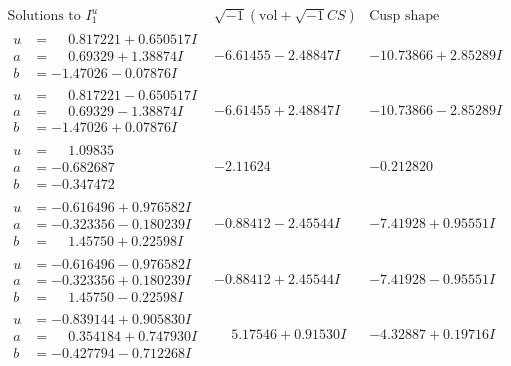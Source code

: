\documentclass[1p]{elsarticle_modified}
\theoremstyle{definition}
\newcommand{\I}{\sqrt{-1}}
\begin{document}
$$\begin{array}{c|c|c}  
\text{Solutions to }I^u_{1}& \I (\text{vol} + \sqrt{-1}CS) & \text{Cusp shape}\\
 \hline 
\begin{aligned}
u &= \phantom{-}0.817221 + 0.650517 I \\
a &= \phantom{-}0.69329 + 1.38874 I \\
b &= -1.47026 - 0.07876 I\end{aligned}
 & -6.61455 - 2.48847 I & -10.73866 + 2.85289 I \\ \hline\begin{aligned}
u &= \phantom{-}0.817221 - 0.650517 I \\
a &= \phantom{-}0.69329 - 1.38874 I \\
b &= -1.47026 + 0.07876 I\end{aligned}
 & -6.61455 + 2.48847 I & -10.73866 - 2.85289 I \\ \hline\begin{aligned}
u &= \phantom{-}1.09835\phantom{ +0.000000I} \\
a &= -0.682687\phantom{ +0.000000I} \\
b &= -0.347472\phantom{ +0.000000I}\end{aligned}
 & -2.11624\phantom{ +0.000000I} & -0.212820\phantom{ +0.000000I} \\ \hline\begin{aligned}
u &= -0.616496 + 0.976582 I \\
a &= -0.323356 - 0.180239 I \\
b &= \phantom{-}1.45750 + 0.22598 I\end{aligned}
 & -0.88412 - 2.45544 I & -7.41928 + 0.95551 I \\ \hline\begin{aligned}
u &= -0.616496 - 0.976582 I \\
a &= -0.323356 + 0.180239 I \\
b &= \phantom{-}1.45750 - 0.22598 I\end{aligned}
 & -0.88412 + 2.45544 I & -7.41928 - 0.95551 I \\ \hline\begin{aligned}
u &= -0.839144 + 0.905830 I \\
a &= \phantom{-}0.354184 + 0.747930 I \\
b &= -0.427794 - 0.712268 I\end{aligned}
 & \phantom{-}5.17546 + 0.91530 I & -4.32887 + 0.19716 I \\ \hline\begin{aligned}

\end{aligned}
\end{array}$$
\end{document}
